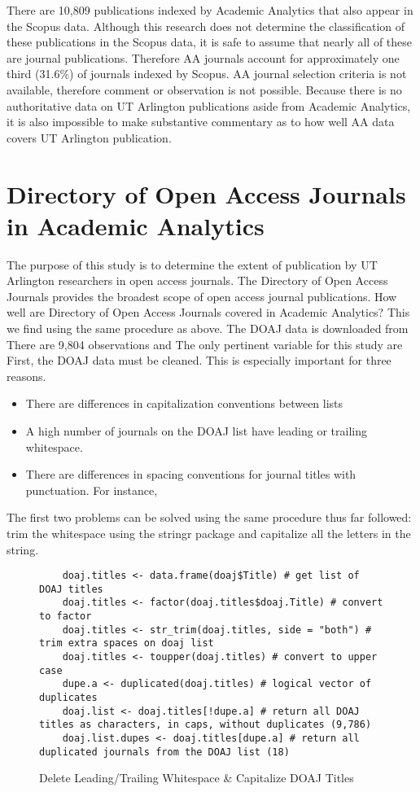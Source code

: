\documentclass{article}
\begin{document}
There are 10,809 publications indexed by Academic Analytics that also appear in the Scopus data. 
Although this research does not determine the classification of these publications in the Scopus data, it is safe to assume that nearly all of these are journal publications.
Therefore AA journals account for approximately one third (31.6\%) of journals indexed by Scopus.
AA journal selection criteria is not available, therefore comment or observation is not possible.
Because there is no authoritative data on UT Arlington publications aside from Academic Analytics, it is also impossible to make substantive commentary as to how well AA data covers UT Arlington publication.

\section{Directory of Open Access Journals in Academic Analytics}
The purpose of this study is to determine the extent of publication by UT Arlington researchers in open access journals.
The Directory of Open Access Journals provides the broadest scope of open access journal publications.
How well are Directory of Open Access Journals covered in Academic Analytics?
This we find using the same procedure as above.
The DOAJ data is downloaded from %
There are 9,804 observations and %
The only pertinent variable for this study are %
First, the DOAJ data must be cleaned.
This is especially important for three reasons.
\begin{itemize}
	\item There are differences in capitalization conventions between lists
	\item A high number of journals on the DOAJ list have leading or trailing whitespace.
	\item There are differences in spacing conventions for journal titles with punctuation. For instance, 
\end{itemize}
The first two problems can be solved using the same procedure thus far followed: trim the whitespace using the stringr package and capitalize all the letters in the string.
\begin{figure}
	\centering
	\begin{lstlisting}
	doaj.titles <- data.frame(doaj$Title) # get list of DOAJ titles
	doaj.titles <- factor(doaj.titles$doaj.Title) # convert to factor
	doaj.titles <- str_trim(doaj.titles, side = "both") # trim extra spaces on doaj list
	doaj.titles <- toupper(doaj.titles) # convert to upper case
	dupe.a <- duplicated(doaj.titles) # logical vector of duplicates
	doaj.list <- doaj.titles[!dupe.a] # return all DOAJ titles as characters, in caps, without duplicates (9,786)
	doaj.list.dupes <- doaj.titles[dupe.a] # return all duplicated journals from the DOAJ list (18)
	\end{lstlisting}
	\caption{Delete Leading/Trailing Whitespace \& Capitalize DOAJ Titles}
\end{figure}
\end{document}
